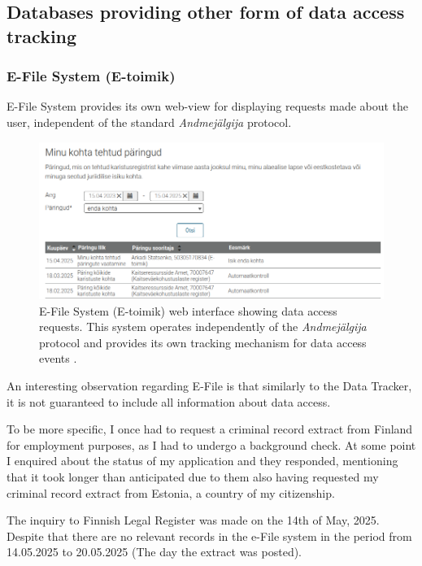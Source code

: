 \subsection{Databases providing other form of data access tracking}

\subsubsection{E-File System (E-toimik)}
E-File System provides its own web-view for displaying requests made about the user, independent of the standard \textit{Andmejälgija} protocol.

\begin{figure}[H]
\centering
\includegraphics[width=450px]{english/figures/e-toimik.png}
\caption{E-File System (E-toimik) web interface showing data access requests. This system operates independently of the \textit{Andmejälgija} protocol and provides its own tracking mechanism for data access events \cite{e-toimik-screenshot}.}
\label{fig:e-toimik}
\end{figure}

An interesting observation regarding E-File is that similarly to the Data Tracker, it is not guaranteed to include all information about data access.

To be more specific, I once had to request a criminal record extract from Finland for employment purposes, as I had to undergo a background check. At some point I enquired about the status of my application and they responded, mentioning that it took longer than anticipated due to them also having requested my criminal record extract from Estonia, a country of my citizenship.

The inquiry to Finnish Legal Register was made on the 14th of May, 2025. Despite that there are no relevant records in the e-File system in the period from 14.05.2025 to 20.05.2025 (The day the extract was posted).

